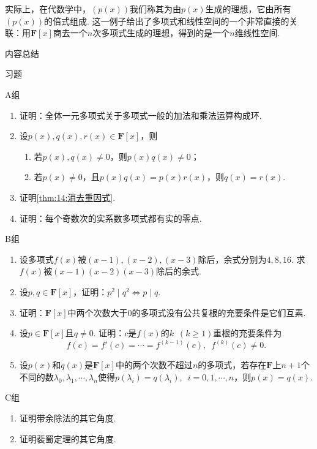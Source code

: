 实际上，在代数学中，$(p(x))$我们称其为由$p(x)$生成的理想，它由所有$(p(x))$的倍式组成. 这一例子给出了多项式和线性空间的一个非常直接的关联：用$\mathbf{F}[x]$商去一个$n$次多项式生成的理想，得到的是一个$n$维线性空间.

\vspace{2ex}
\centerline{\heiti \Large 内容总结}


\vspace{2ex}
\centerline{\heiti \Large 习题}

\vspace{2ex}
{\kaishu }
\begin{flushright}
    \kaishu

\end{flushright}

\centerline{\heiti A组}
\begin{enumerate}
    \item 证明：全体一元多项式关于多项式一般的加法和乘法运算构成环.
    \item 设$p(x),q(x),r(x)\in\mathbf{F}[x]$，则
    \begin{enumerate}
        \item 若$p(x),q(x)\neq 0$，则$p(x)q(x)\neq 0$；
        \item 若$p(x)\neq 0$，且$p(x)q(x)=p(x)r(x)$，则$q(x)=r(x)$.
    \end{enumerate}
    \item 证明\autoref{thm:14:消去重因式}.
    \item 证明：每个奇数次的实系数多项式都有实的零点.
\end{enumerate}

\centerline{\heiti B组}
\begin{enumerate}
    \item 设多项式$f(x)$被$(x-1),(x-2),(x-3)$除后，余式分别为$4,8,16$. 求$f(x)$被$(x-1)(x-2)(x-3)$除后的余式.
    \item 设$p,q\in\mathbf{F}[x]$，证明：$p^2 \mid q^2\iff p \mid q$.
    \item 证明：$\mathbf{F}[x]$中两个次数大于0的多项式没有公共复根的充要条件是它们互素.
    \item 设$p\in\mathbf{F}[x]$且$q\neq 0$. 证明：$c$是$f(x)$的$k\enspace(k\geqslant 1)$重根的充要条件为
    \[f(c)=f'(c)=\cdots=f^{(k-1)}(c),\enspace f^{(k)}(c)\neq 0.\]
    \item 设$p(x)$和$q(x)$是$\mathbf{F}[x]$中的两个次数不超过$n$的多项式，若存在$\mathbf{F}$上$n+1$个不同的数$\lambda_0,\lambda_1,\cdots,\lambda_n$使得$p(\lambda_i)=q(\lambda_i),\enspace i=0,1,\cdots,n$，则$p(x)=q(x)$.
\end{enumerate}

\centerline{\heiti C组}
\begin{enumerate}
    \item 证明带余除法的其它角度.
    \item 证明裴蜀定理的其它角度.
\end{enumerate}
